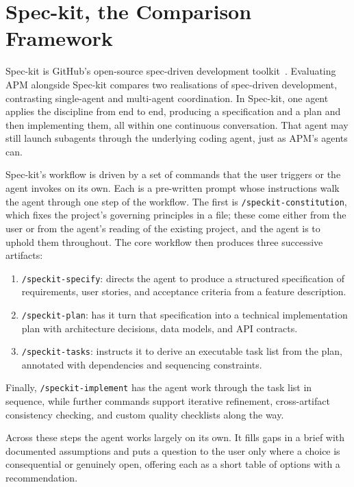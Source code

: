 \section{Spec-kit, the Comparison Framework}
\label{sec:evaluation-comparison-framework}

Spec-kit is GitHub's open-source spec-driven development toolkit~\cite{github2026speckitdocs}. Evaluating APM alongside Spec-kit compares two realisations of spec-driven development, contrasting single-agent and multi-agent coordination. In Spec-kit, one agent applies the discipline from end to end, producing a specification and a plan and then implementing them, all within one continuous conversation. That agent may still launch subagents through the underlying coding agent, just as APM's agents can.

Spec-kit's workflow is driven by a set of commands that the user triggers or the agent invokes on its own. Each is a pre-written prompt whose instructions walk the agent through one step of the workflow. The first is \texttt{/speckit-constitution}, which fixes the project's governing principles in a file; these come either from the user or from the agent's reading of the existing project, and the agent is to uphold them throughout. The core workflow then produces three successive artifacts:

\begin{enumerate}
    \item \texttt{/speckit-specify}: directs the agent to produce a structured specification of requirements, user stories, and acceptance criteria from a feature description.
    \item \texttt{/speckit-plan}: has it turn that specification into a technical implementation plan with architecture decisions, data models, and API contracts.
    \item \texttt{/speckit-tasks}: instructs it to derive an executable task list from the plan, annotated with dependencies and sequencing constraints.
\end{enumerate}

Finally, \texttt{/speckit-implement} has the agent work through the task list in sequence, while further commands support iterative refinement, cross-artifact consistency checking, and custom quality checklists along the way.

Across these steps the agent works largely on its own. It fills gaps in a brief with documented assumptions and puts a question to the user only where a choice is consequential or genuinely open, offering each as a short table of options with a recommendation.


